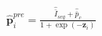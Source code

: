 $\hat{\mathbf{p}}^{pre}_i=\frac{\widehat{\bar{I}}_{seq}+\widehat{\bar{p}}_c}{1+\exp\left(-\mathbf{z}_i\right)}$
